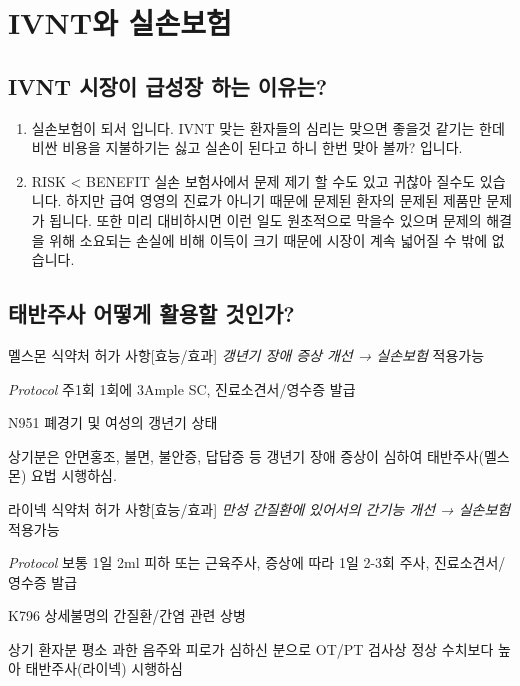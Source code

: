 \section*{IVNT와 실손보험}
\subsection*{IVNT 시장이 급성장 하는 이유는?}
\begin{enumerate}[첫번째]\tightlist
\item 실손보험이 되서 입니다. IVNT 맞는 환자들의 심리는 맞으면 좋을것 같기는 한데 비싼 비용을 지불하기는 싫고 실손이 된다고 하니 한번 맞아 볼까? 입니다.
\item RISK < BENEFIT \newline 실손 보험사에서 문제 제기 할 수도 있고 귀찮아 질수도 있습니다. 하지만 급여 영영의 진료가 아니기 때문에 문제된 환자의 문제된 제품만 문제가 됩니다. 또한 미리 대비하시면 이런 일도 원초적으로 막을수 있으며 문제의 해결을 위해 소요되는 손실에 비해 이득이 크기 때문에 시장이 계속 넓어질 수 밖에 없습니다.
\end{enumerate}\tightlist

\subsection*{태반주사 어떻게 활용할 것인가?}
\begin{commentbox}{멜스몬}
식약처 허가 사항[효능/효과] \emph{갱년기 장애 증상 개선 → 실손보험} 적용가능 \par
\emph{Protocol} 주1회 1회에 3Ample SC, 진료소견서/영수증 발급
\begin{description}\tightlist
\item[적합상병] N951 폐경기 및 여성의 갱년기 상태
\item[소견서 내용] 상기분은 안면홍조, 불면, 불안증, 답답증 등 갱년기 장애 증상이 심하여 태반주사(멜스몬) 요법 시행하심.
\end{description}
\end{commentbox}

\begin{commentbox}{라이넥}
식약처 허가 사항[효능/효과] \emph{만성 간질환에 있어서의 간기능 개선 → 실손보험} 적용가능 \par
\emph{Protocol} 보통 1일 2ml 피하 또는 근육주사, 증상에 따라 1일 2-3회 주사, 진료소견서/영수증 발급\par
\begin{description}\tightlist
\item[적합상병] K796 상세불명의 간질환/간염 관련 상병
\item[소견서 내용] 상기 환자분 평소 과한 음주와 피로가 심하신 분으로 OT/PT 검사상 정상 수치보다 높아 태반주사(라이넥) 시행하심
\end{description}
\end{commentbox}